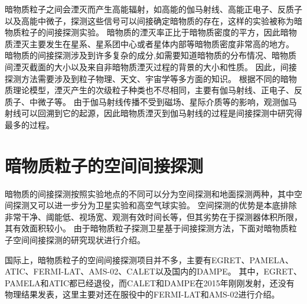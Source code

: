 暗物质粒子之间会湮灭而产生高能辐射，如高能的伽马射线、高能正电子、反质子以及高能中微子，探测这些信号可以间接确定暗物质的存在，这样的实验被称为暗物质粒子的间接探测实验。
暗物质的湮灭率正比于暗物质密度的平方\parencite{bixiaojun}，因此暗物质湮灭主要发生在星系、星系团中心或者星体内部等暗物质密度非常高的地方。
暗物质的间接探测涉及到许多复杂的成分,如需要知道暗物质的分布情况、暗物质间湮灭截面的大小以及来自非暗物质湮灭过程的背景的大小和性质。
因此，间接探测方法需要涉及到粒子物理、天文、宇宙学等多方面的知识。
根据不同的暗物质理论模型，湮灭产生的次级粒子种类也不尽相同，主要有伽马射线、正电子、反质子、中微子等。
由于伽马射线传播不受到磁场、星际介质等的影响，观测伽马射线可以回溯到它的起源，因此暗物质湮灭到伽马射线的过程是间接探测中研究得最多的过程。

\section{暗物质粒子的空间间接探测}
暗物质的间接探测按照实验地点的不同可以分为空间探测和地面探测两种，其中空间探测又可以进一步分为卫星实验和高空气球实验。
空间探测的优势是本底排除非常干净、阈能低、视场宽、观测有效时间长等，但其劣势在于探测器体积所限，其有效面积较小。
由于暗物质粒子探测卫星基于间接探测方法，下面对暗物质粒子空间间接探测的研究现状进行介绍。

国际上，暗物质粒子的空间间接探测项目并不多，主要有EGRET\parencite{egret}、PAMELA\parencite{pamela}、ATIC\parencite{atic}、FERMI-LAT\parencite{glast}、AMS-02\parencite{ams02_detector}、CALET\parencite{calet}以及国内的DAMPE。
其中，EGRET、PAMELA和ATIC都已经退役，而CALET和DAMPE在2015年刚刚发射，还没有物理结果发表，这里主要对还在服役中的FERMI-LAT和AMS-02进行介绍。

